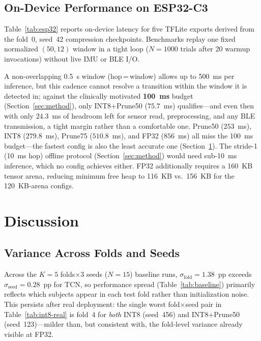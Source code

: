 \documentclass[conference]{IEEEtran}
\begin{document}
\subsection{On-Device Performance on ESP32-C3}
\label{sec:esp32-results}

Table~\ref{tab:esp32} reports on-device latency for five TFLite exports derived from the fold~0,
seed~42 compression checkpoints. Benchmarks replay one fixed normalized $(50,12)$ window in a tight
loop ($N{=}1000$ trials after 20 warmup invocations) without live IMU or BLE I/O.

A non-overlapping 0.5~s window (hop\,=\,window) allows up to 500~ms per inference, but this cadence
cannot resolve a transition within the window it is detected in; against the clinically motivated
\textbf{100~ms} budget (Section~\ref{sec:method}), only INT8+Prune50 ($75.7$~ms) qualifies---and
even then with only $24.3$~ms of headroom left for sensor read, preprocessing, and any BLE
transmission, a tight margin rather than a comfortable one. Prune50 ($253$~ms), INT8 ($279.8$~ms),
Prune75 ($510.8$~ms), and FP32 ($856$~ms) all miss the 100~ms budget---the fastest config is also
the least accurate one (Section~\ref{sec:discussion}). The stride-1 (10~ms hop) offline protocol
(Section~\ref{sec:method}) would need sub-10~ms inference, which no config achieves either. FP32
additionally requires a 160~KB tensor arena, reducing minimum free heap to 116~KB vs.\ 156~KB for
the 120~KB-arena configs.



\section{Discussion}
\label{sec:discussion}

\subsection{Variance Across Folds and Seeds}

Across the $K{=}5$ folds$\times$3 seeds ($N{=}15$) baseline runs, $\sigma_{\mathrm{fold}}{=}1.38$~pp
exceeds $\sigma_{\mathrm{seed}}{=}0.28$~pp for TCN, so performance spread (Table~\ref{tab:baseline})
primarily reflects which subjects appear in each test fold rather than initialization noise. This
persists after real deployment: the single worst fold$\times$seed pair in Table~\ref{tab:int8-real}
is fold~4 for \emph{both} INT8 (seed~456) and INT8+Prune50 (seed~123)---milder than, but consistent
with, the fold-level variance already visible at FP32.
\end{document}
